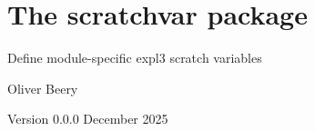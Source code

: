 \documentclass{article}
\begin{document}
\section*{\LARGE The \textsf{scratchvar} package}

Define module-specific \textsf{expl3} scratch variables

Oliver Beery

Version 0.0.0 December 2025

\end{document}
